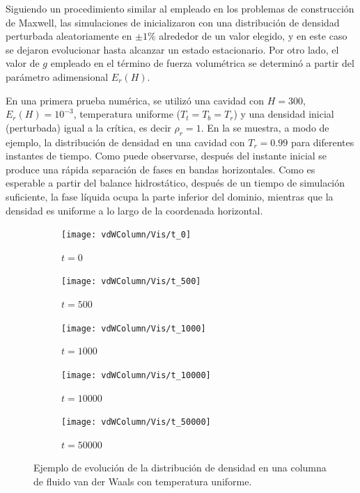 Siguiendo un procedimiento similar al empleado en los problemas de construcci\'on de Maxwell, las simulaciones de inicializaron con una distribuci\'on de densidad perturbada aleatoriamente en $\pm1\%$ alrededor de un valor elegido, y en este caso se dejaron evolucionar hasta alcanzar un estado estacionario. Por otro lado, el valor de $g$ empleado en el t\'ermino de fuerza volum\'etrica se determin\'o a partir del par\'ametro adimensional $E_r(H)$.

En una primera prueba num\'erica, se utiliz\'o una cavidad con $H=300$, $E_r(H)=10^{-3}$, temperatura uniforme ($T_t = T_b = T_r$) y una densidad inicial (perturbada) igual a la cr\'itica, es decir $\rho_r=1$. En la  se muestra, a modo de ejemplo, la distribuci\'on de densidad en una cavidad con $T_r=0.99$ para diferentes instantes de tiempo. Como puede observarse, despu\'es del instante inicial se produce una r\'apida separaci\'on de fases en  bandas horizontales. Como es esperable a partir del balance hidrost\'atico, despu\'es de un tiempo de simulaci\'on suficiente, la fase l\'iquida ocupa la parte inferior del dominio, mientras que la densidad es uniforme a lo largo de la coordenada horizontal.

\begin{figure}[htb]
    \centering
    \begin{subfigure}[t]{0.18\textwidth}
        \centering
        \texttt{[image: vdWColumn/Vis/t\_0]}   
        \caption{$t=0$}     
    \end{subfigure}
    \begin{subfigure}[t]{0.18\textwidth}
        \centering
        \texttt{[image: vdWColumn/Vis/t\_500]}   
        \caption{$t=500$}     
    \end{subfigure}
    \begin{subfigure}[t]{0.18\textwidth}
        \centering
        \texttt{[image: vdWColumn/Vis/t\_1000]}   
        \caption{$t=1000$}     
    \end{subfigure}    
    \begin{subfigure}[t]{0.18\textwidth}
        \centering
        \texttt{[image: vdWColumn/Vis/t\_10000]}   
        \caption{$t=10000$}     
    \end{subfigure}      
    \begin{subfigure}[t]{0.18\textwidth}
        \centering
        \texttt{[image: vdWColumn/Vis/t\_50000]}   
        \caption{$t=50000$}
    \end{subfigure}      
    \caption{Ejemplo de evoluci\'on de la distribuci\'on de densidad en una columna de fluido van der Waals con temperatura uniforme.}
	\label{fig:vdWColumn_evolucion}
\end{figure}

